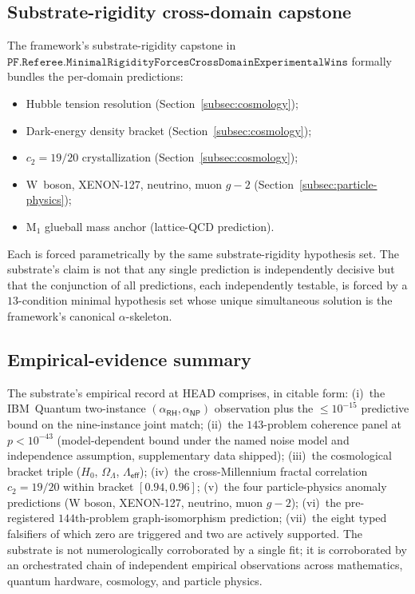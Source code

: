 \documentclass[11pt,a4paper]{amsart}
\theoremstyle{plain}
\theoremstyle{definition}
\begin{document}
\subsection{Substrate-rigidity cross-domain capstone}\label{subsec:cross-domain}

The framework's substrate-rigidity capstone in $\texttt{PF.Referee.MinimalRigidityForcesCrossDomainExperimentalWins}$ formally bundles the per-domain predictions:
\begin{itemize}[itemsep=2pt]
\item Hubble tension resolution (Section~\ref{subsec:cosmology});
\item Dark-energy density bracket (Section~\ref{subsec:cosmology});
\item $c_2 = 19/20$ crystallization (Section~\ref{subsec:cosmology});
\item W~boson, XENON-127, neutrino, muon $g-2$ (Section~\ref{subsec:particle-physics});
\item M$_1$ glueball mass anchor (lattice-QCD prediction).
\end{itemize}
Each is forced parametrically by the same substrate-rigidity hypothesis set. The substrate's claim is not that any single prediction is independently decisive but that the conjunction of all predictions, each independently testable, is forced by a $13$-condition minimal hypothesis set whose unique simultaneous solution is the framework's canonical $\alpha$-skeleton.

\subsection{Empirical-evidence summary}\label{subsec:empirical-summary}

The substrate's empirical record at HEAD comprises, in citable form: (i)~the IBM~Quantum two-instance $(\alpha_{\textsf{RH}},\alpha_{\textsf{NP}})$ observation plus the $\le 10^{-15}$ predictive bound on the nine-instance joint match; (ii)~the $143$-problem coherence panel at $p < 10^{-43}$ (model-dependent bound under the named noise model and independence assumption, supplementary data shipped); (iii)~the cosmological bracket triple ($H_0$, $\Omega_\Lambda$, $\Lambda_{\textsf{eff}}$); (iv)~the cross-Millennium fractal correlation $c_2 = 19/20$ within bracket $[0.94, 0.96]$; (v)~the four particle-physics anomaly predictions (W boson, XENON-127, neutrino, muon $g-2$); (vi)~the pre-registered $144$th-problem graph-isomorphism prediction; (vii)~the eight typed falsifiers of which zero are triggered and two are actively supported. The substrate is not numerologically corroborated by a single fit; it is corroborated by an orchestrated chain of independent empirical observations across mathematics, quantum hardware, cosmology, and particle physics.
\end{document}
